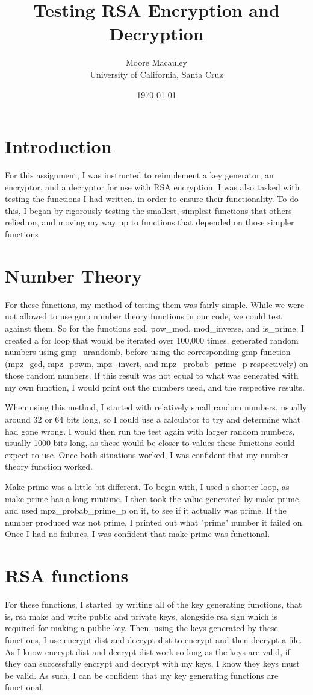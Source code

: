 \documentclass[11pt]{article}
\title{Testing RSA Encryption and Decryption}
\author{Moore Macauley \\ University of California, Santa Cruz}
\date{\today}
\begin{document}
\maketitle
\section{Introduction}
For this assignment, I was instructed to reimplement a key generator, an encryptor, and a decryptor for use with RSA encryption. I was also tasked with testing the functions I had written, in order to ensure their functionality. To do this, I began by rigorously testing the smallest, simplest functions that others relied on, and moving my way up to functions that depended on those simpler functions

\section{Number Theory}
For these functions, my method of testing them was fairly simple. While we were not allowed to use gmp number theory functions in our code, we could test against them. So for the functions gcd, pow\_mod, mod\_inverse, and is\_prime, I created a for loop that would be iterated over 100,000 times, generated random numbers using gmp\_urandomb, before using the corresponding gmp function (mpz\_gcd, mpz\_powm, mpz\_invert, and mpz\_probab\_prime\_p respectively) on those random numbers. If this result was not equal to what was generated with my own function, I would print out the numbers used, and the respective results.

When using this method, I started with relatively small random numbers, usually around 32 or 64 bits long, so I could use a calculator to try and determine what had gone wrong. I would then run the test again with larger random numbers, usually 1000 bits long, as these would be closer to values these functions could expect to use. Once both situations worked, I was confident that my number theory function worked.

Make prime was a little bit different. To begin with, I used a shorter loop, as make prime has a long runtime. I then took the value generated by make prime, and used mpz\_probab\_prime\_p on it, to see if it actually was prime. If the number produced was not prime, I printed out what "prime" number it failed on. Once I had no failures, I was confident that make prime was functional.

\section{RSA functions}
For these functions, I started by writing all of the key generating functions, that is, rsa make and write public and private keys, alongside rsa sign which is required for making a public key. Then, using the keys generated by these functions, I use encrypt-dist and decrypt-dist to encrypt and then decrypt a file. As I know encrypt-dist and decrypt-dist work so long as the keys are valid, if they can successfully encrypt and decrypt with my keys, I know they keys must be valid. As such, I can be confident that my key generating functions are functional.
\end{document}
